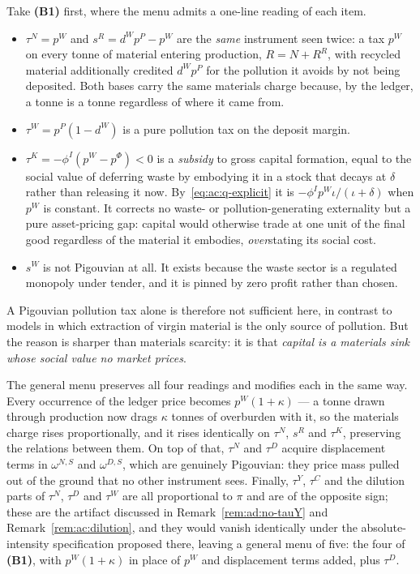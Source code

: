  Take \textbf{(B1)} first, where the menu admits a one-line reading of each item.
\begin{itemize}[leftmargin=1.6em,itemsep=0.2em]
\item $\tau^N=p^W$ and $s^R=d^Wp^P-p^W$ are the \emph{same} instrument seen twice: a tax $p^W$ on every tonne of material entering production, $R=N+R^R$, with recycled material additionally credited $d^Wp^P$ for the pollution it avoids by not being deposited. Both bases carry the same materials charge because, by the ledger, a tonne is a tonne regardless of where it came from.
\item $\tau^W=p^P\left(1-d^W\right)$ is a pure pollution tax on the deposit margin.
\item $\tau^K=-\phi^I\left(p^W-p^\Phi\right)<0$ is a \emph{subsidy} to gross capital formation, equal to the social value of deferring waste by embodying it in a stock that decays at $\delta$ rather than releasing it now. By~\eqref{eq:ac:q-explicit} it is $-\phi^Ip^W\iota/(\iota+\delta)$ when $p^W$ is constant. It corrects no waste- or pollution-generating externality but a pure asset-pricing gap: capital would otherwise trade at one unit of the final good regardless of the material it embodies, \emph{over}stating its social cost.
\item $s^W$ is not Pigouvian at all. It exists because the waste sector is a regulated monopoly under tender, and it is pinned by zero profit rather than chosen.
\end{itemize}
A Pigouvian pollution tax alone is therefore not sufficient here, in contrast to models in which extraction of virgin material is the only source of pollution. But the reason is sharper than materials scarcity: it is that \emph{capital is a materials sink whose social value no market prices}.

The general menu preserves all four readings and modifies each in the same way. Every occurrence of the ledger price becomes $p^W\left(1+\kappa\right)$ --- a tonne drawn through production now drags $\kappa$ tonnes of overburden with it, so the materials charge rises proportionally, and it rises identically on $\tau^N$, $s^R$ and $\tau^K$, preserving the relations between them. On top of that, $\tau^N$ and $\tau^D$ acquire displacement terms in $\omega^{N,S}$ and $\omega^{D,S}$, which are genuinely Pigouvian: they price mass pulled out of the ground that no other instrument sees. Finally, $\tau^Y$, $\tau^C$ and the dilution parts of $\tau^N$, $\tau^D$ and $\tau^W$ are all proportional to $\pi$ and are of the opposite sign; these are the artifact discussed in Remark~\ref{rem:ad:no-tauY} and Remark~\ref{rem:ac:dilution}, and they would vanish identically under the absolute-intensity specification proposed there, leaving a general menu of five: the four of \textbf{(B1)}, with $p^W\left(1+\kappa\right)$ in place of $p^W$ and displacement terms added, plus $\tau^D$.

